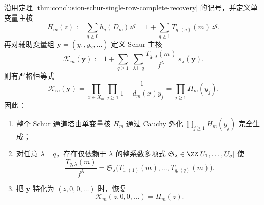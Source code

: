 \begin{theorem}\label{thm:conclusion-schur-master-kernel-cauchy-externalization}
沿用定理 \ref{thm:conclusion-schur-single-row-complete-recovery} 的记号，并定义单变量主核
\[
H_m(z):=\sum_{q\ge 0}h_q(D_m)z^q
=
1+\sum_{q\ge 1}T_{q,(q)}(m)\,z^q.
\]
再对辅助变量组 \(\mathbf y=(y_1,y_2,\dots)\) 定义 Schur 主核
\[
\mathcal K_m(\mathbf y)
:=
1+\sum_{q\ge 1}\ \sum_{\lambda\vdash q}
\frac{T_{q,\lambda}(m)}{f^\lambda}\,s_\lambda(\mathbf y).
\]
则有严格恒等式
\[
\boxed{\;
\mathcal K_m(\mathbf y)
=
\prod_{x\in X_m}\prod_{j\ge 1}\frac{1}{1-d_m(x)y_j}
=
\prod_{j\ge 1}H_m(y_j).\;}
\]
因此：
\begin{enumerate}
  \item 整个 Schur 通道塔由单变量核 \(H_m\) 通过 Cauchy 外化 \(\prod_{j\ge 1}H_m(y_j)\) 完全生成；
  \item 对任意 \(\lambda\vdash q\)，存在仅依赖于 \(\lambda\) 的整系数多项式 \(\mathfrak S_\lambda\in\ZZ[U_1,\dots,U_q]\) 使
  \[
  \boxed{\;
  \frac{T_{q,\lambda}(m)}{f^\lambda}
  =
  \mathfrak S_\lambda\bigl(
  T_{1,(1)}(m),\dots,T_{q,(q)}(m)
  \bigr).\;}
  \]
  \item 把 \(\mathbf y\) 特化为 \((z,0,0,\dots)\) 时，恢复
  \[
  \boxed{\;
  \mathcal K_m(z,0,0,\dots)=H_m(z).\;}
  \]
\end{enumerate}
\end{theorem}
